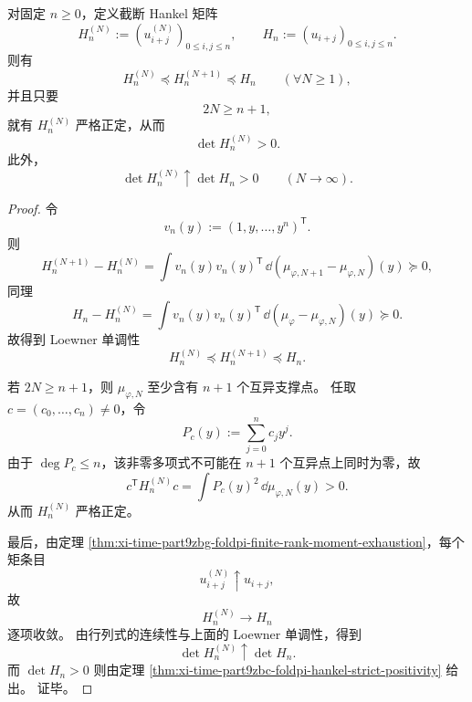 \begin{theorem}\label{thm:xi-time-part9zbg-foldpi-finite-rank-hankel-threshold}
对固定 \(n\ge 0\)，定义截断 Hankel 矩阵
\[
H_n^{(N)}:=(u_{i+j}^{(N)})_{0\le i,j\le n},
\qquad
H_n:=(u_{i+j})_{0\le i,j\le n}.
\]
则有
\[
H_n^{(N)}\preceq H_n^{(N+1)}\preceq H_n
\qquad (\forall N\ge 1),
\]
并且只要
\[
2N\ge n+1,
\]
就有 \(H_n^{(N)}\) 严格正定，从而
\[
\det H_n^{(N)}>0.
\]
此外，
\[
\det H_n^{(N)}\uparrow \det H_n>0
\qquad (N\to\infty).
\]
\end{theorem}
\begin{proof}
令
\[
v_n(y):=(1,y,\dots,y^n)^{\mathsf T}.
\]
则
\[
H_n^{(N+1)}-H_n^{(N)}
=
\int v_n(y)v_n(y)^{\mathsf T}\,\dd(\mu_{\varphi,N+1}-\mu_{\varphi,N})(y)\succeq 0,
\]
同理
\[
H_n-H_n^{(N)}
=
\int v_n(y)v_n(y)^{\mathsf T}\,\dd(\mu_\varphi-\mu_{\varphi,N})(y)\succeq 0.
\]
故得到 Loewner 单调性
\[
H_n^{(N)}\preceq H_n^{(N+1)}\preceq H_n.
\]

若 \(2N\ge n+1\)，则 \(\mu_{\varphi,N}\) 至少含有 \(n+1\) 个互异支撑点。
任取 \(c=(c_0,\dots,c_n)\neq 0\)，令
\[
P_c(y):=\sum_{j=0}^{n}c_j y^j.
\]
由于 \(\deg P_c\le n\)，该非零多项式不可能在 \(n+1\) 个互异点上同时为零，故
\[
c^{\mathsf T}H_n^{(N)}c
=
\int P_c(y)^2\,\dd\mu_{\varphi,N}(y)>0.
\]
从而 \(H_n^{(N)}\) 严格正定。

最后，由定理 \ref{thm:xi-time-part9zbg-foldpi-finite-rank-moment-exhaustion}，每个矩条目
\[
u_{i+j}^{(N)}\uparrow u_{i+j},
\]
故
\[
H_n^{(N)}\longrightarrow H_n
\]
逐项收敛。
由行列式的连续性与上面的 Loewner 单调性，得到
\[
\det H_n^{(N)}\uparrow \det H_n.
\]
而 \(\det H_n>0\) 则由定理 \ref{thm:xi-time-part9zbc-foldpi-hankel-strict-positivity} 给出。
证毕。
\end{proof}

